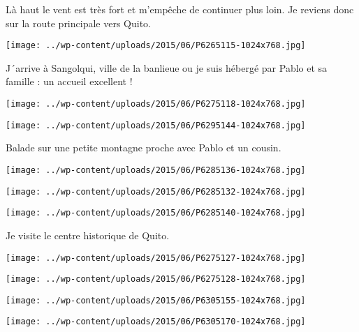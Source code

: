  Là haut le vent est très fort et m'empêche de continuer plus loin. \newline
 Je reviens donc sur la route principale vers Quito. \newline
 \newline
\centerline{\texttt{[image: ../wp-content/uploads/2015/06/P6265115-1024x768.jpg]} } 
 \newline
 J´arrive à Sangolqui, ville de la banlieue ou je suis hébergé par Pablo et sa famille : un accueil excellent ! \newline
 \newline
\centerline{\texttt{[image: ../wp-content/uploads/2015/06/P6275118-1024x768.jpg]} } 
 \newline
 \newline
\centerline{\texttt{[image: ../wp-content/uploads/2015/06/P6295144-1024x768.jpg]} } 
 \newline
 Balade sur une petite montagne proche avec Pablo et un cousin. \newline
 \newline
\centerline{\texttt{[image: ../wp-content/uploads/2015/06/P6285136-1024x768.jpg]} } 
 \newline
 \newline
\centerline{\texttt{[image: ../wp-content/uploads/2015/06/P6285132-1024x768.jpg]} } 
 \newline
 \newline
\centerline{\texttt{[image: ../wp-content/uploads/2015/06/P6285140-1024x768.jpg]} } 
 \newline
 Je visite le centre historique de Quito. \newline
 \newline
\centerline{\texttt{[image: ../wp-content/uploads/2015/06/P6275127-1024x768.jpg]} } 
 \newline
 \newline
\centerline{\texttt{[image: ../wp-content/uploads/2015/06/P6275128-1024x768.jpg]} } 
 \newline
 \newline
\centerline{\texttt{[image: ../wp-content/uploads/2015/06/P6305155-1024x768.jpg]} } 
 \newline
 \newline
\centerline{\texttt{[image: ../wp-content/uploads/2015/06/P6305170-1024x768.jpg]} } 
 \newline
 \newline
